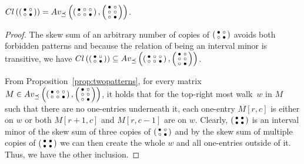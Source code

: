 \begin{prop}
$Cl\left(\left(\begin{smallmatrix}\bullet&\circ\\\circ&\bullet\end{smallmatrix}\right)\right)=Av_{\preceq}\left(\left(\begin{smallmatrix}\bullet&\circ&\circ\\\circ&\circ&\bullet\end{smallmatrix}\right),\left(\begin{smallmatrix}\bullet&\circ\\\circ&\circ\\\circ&\bullet\end{smallmatrix}\right)\right)$.
\end{prop}
\begin{proof}
The skew sum of an arbitrary number of copies of $\left(\begin{smallmatrix}\bullet&\circ\\\circ&\bullet\end{smallmatrix}\right)$ avoids both forbidden patterns and because the relation of being an interval minor is transitive, we have $Cl\left(\left(\begin{smallmatrix}\bullet&\circ\\\circ&\bullet\end{smallmatrix}\right)\right)\subseteq Av_{\preceq}\left(\left(\begin{smallmatrix}\bullet&\circ&\circ\\\circ&\circ&\bullet\end{smallmatrix}\right),\left(\begin{smallmatrix}\bullet&\circ\\\circ&\circ\\\circ&\bullet\end{smallmatrix}\right)\right)$.

From Proposition~\ref{prop:twopatterns}, for every matrix~$M\in Av_{\preceq}\left(\left(\begin{smallmatrix}\bullet&\circ&\circ\\\circ&\circ&\bullet\end{smallmatrix}\right),\left(\begin{smallmatrix}\bullet&\circ\\\circ&\circ\\\circ&\bullet\end{smallmatrix}\right)\right)$, it holds that for the top-right most walk~$w$ in $M$ such that there are no one-entries underneath it, each one-entry $M[r,c]$ is either on $w$ or both $M[r+1,c]$ and $M[r,c-1]$ are on $w$. Clearly, $\left(\begin{smallmatrix}\bullet&\bullet\\\bullet&\bullet\end{smallmatrix}\right)$ is an interval minor of the skew sum of three copies of $\left(\begin{smallmatrix}\bullet&\circ\\\circ&\bullet\end{smallmatrix}\right)$ and by the skew sum of multiple copies of $\left(\begin{smallmatrix}\bullet&\bullet\\\bullet&\bullet\end{smallmatrix}\right)$ we can then create the whole $w$ and all one-entries outside of it. Thus, we have the other inclusion.
\end{proof}


